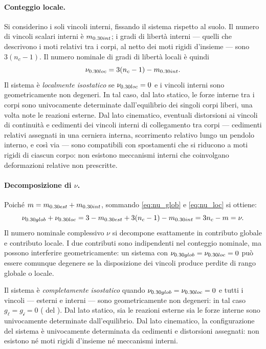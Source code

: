 \paragraph{Conteggio locale.}
Si considerino i soli vincoli interni, fissando il sistema
rispetto al suolo. Il numero di vincoli scalari interni è
$m_{\rm int}$; i gradi di libertà interni --- quelli che
descrivono i moti relativi tra i corpi, al netto dei moti
rigidi d'insieme --- sono $3(n_c - 1)$. Il numero nominale
di gradi di libertà locali è quindi
\begin{equation}\label{eq:nu_loc}
	\nu_{\rm loc} = 3(n_c - 1) - m_{\rm int}.
\end{equation}
Il sistema è \emph{localmente isostatico} se $\nu_{\rm loc}
= 0$ e i vincoli interni sono geometricamente non degeneri.
In tal caso, dal lato statico, le forze interne tra i corpi
sono univocamente determinate dall'equilibrio dei singoli
corpi liberi, una volta note le reazioni esterne. Dal lato
cinematico, eventuali distorsioni ai vincoli di continuità
e cedimenti dei vincoli interni di collegamento tra corpi
--- cedimenti relativi assegnati in una cerniera interna,
scorrimento relativo lungo un pendolo interno, e così via
--- sono compatibili con spostamenti che si riducono a moti
rigidi di ciascun corpo: non esistono meccanismi interni
che coinvolgano deformazioni relative non prescritte.

\paragraph{Decomposizione di $\nu$.}
Poiché $m = m_{\rm est} + m_{\rm int}$, sommando
\eqref{eq:nu_glob} e \eqref{eq:nu_loc} si ottiene:
\begin{equation}\label{eq:nu_decomp}
	\nu_{\rm glob} + \nu_{\rm loc}
	= 3 - m_{\rm est} + 3(n_c-1) - m_{\rm int}
	= 3n_c - m = \nu.
\end{equation}
Il numero nominale complessivo $\nu$ si decompone
esattamente in contributo globale e contributo locale.
I due contributi sono indipendenti nel conteggio nominale,
ma possono interferire geometricamente: un sistema con
$\nu_{\rm glob} = \nu_{\rm loc} = 0$ può essere comunque
degenere se la disposizione dei vincoli produce perdite di
rango globale o locale.

\begin{oss}
	Il sistema è \emph{completamente isostatico} quando
	$\nu_{\rm glob} = \nu_{\rm loc} = 0$ e tutti i vincoli
	--- esterni e interni --- sono geometricamente non
	degeneri: in tal caso $g_\ell = g_{\mathscr{i}} = 0$
	( del
	). Dal lato statico,
	sia le reazioni esterne sia le forze interne sono
	univocamente determinate dall'equilibrio. Dal lato
	cinematico, la configurazione del sistema è
	univocamente determinata da cedimenti e distorsioni
	assegnati: non esistono né moti rigidi d'insieme
	né meccanismi interni.
\end{oss}

